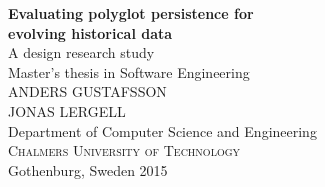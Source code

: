 
\begin{titlepage}
			
\addtolength{\voffset}{2cm}


\mbox{}
\vfill
\renewcommand{\familydefault}{\sfdefault} \normalfont %
\textbf{{\Huge Evaluating polyglot persistence for \\[0.2cm] evolving historical data }}\\[0.5cm]
{\Large A design research study}\\[0.5cm]
Master's thesis in Software Engineering \\[0.5cm]

{\Large ANDERS GUSTAFSSON\\[0.3cm] JONAS LERGELL}\\[2.5cm]

Department of Computer Science and Engineering \\
\textsc{Chalmers University of Technology} \\
Gothenburg, Sweden 2015

\renewcommand{\familydefault}{\rmdefault} \normalfont %
\end{titlepage}


\newpage
\restoregeometry
\thispagestyle{empty}
\mbox{}


